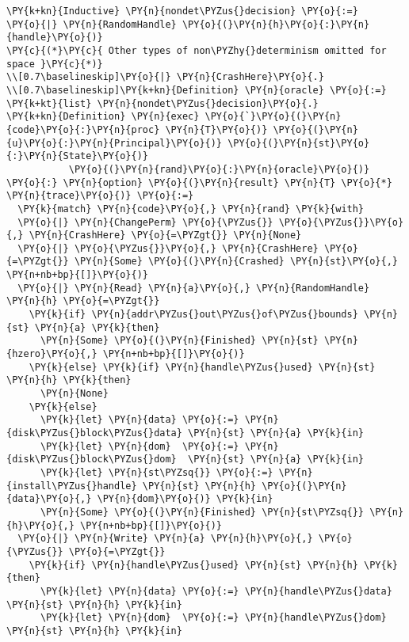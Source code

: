 \begin{BVerbatim}[commandchars=\\\{\},codes={\catcode`\$=3\catcode`\^=7\catcode`\_=8},fontsize=\footnotesize]
\PY{k+kn}{Inductive} \PY{n}{nondet\PYZus{}decision} \PY{o}{:=}
\PY{o}{|} \PY{n}{RandomHandle} \PY{o}{(}\PY{n}{h}\PY{o}{:}\PY{n}{handle}\PY{o}{)}
\PY{c}{(*}\PY{c}{ Other types of non\PYZhy{}determinism omitted for space }\PY{c}{*)}
\\[0.7\baselineskip]\PY{o}{|} \PY{n}{CrashHere}\PY{o}{.}
\\[0.7\baselineskip]\PY{k+kn}{Definition} \PY{n}{oracle} \PY{o}{:=} \PY{k+kt}{list} \PY{n}{nondet\PYZus{}decision}\PY{o}{.}
\PY{k+kn}{Definition} \PY{n}{exec} \PY{o}{`}\PY{o}{(}\PY{n}{code}\PY{o}{:}\PY{n}{proc} \PY{n}{T}\PY{o}{)} \PY{o}{(}\PY{n}{u}\PY{o}{:}\PY{n}{Principal}\PY{o}{)} \PY{o}{(}\PY{n}{st}\PY{o}{:}\PY{n}{State}\PY{o}{)}
           \PY{o}{(}\PY{n}{rand}\PY{o}{:}\PY{n}{oracle}\PY{o}{)} \PY{o}{:} \PY{n}{option} \PY{o}{(}\PY{n}{result} \PY{n}{T} \PY{o}{*} \PY{n}{trace}\PY{o}{)} \PY{o}{:=}
  \PY{k}{match} \PY{n}{code}\PY{o}{,} \PY{n}{rand} \PY{k}{with}
  \PY{o}{|} \PY{n}{ChangePerm} \PY{o}{\PYZus{}} \PY{o}{\PYZus{}}\PY{o}{,} \PY{n}{CrashHere} \PY{o}{=\PYZgt{}} \PY{n}{None}
  \PY{o}{|} \PY{o}{\PYZus{}}\PY{o}{,} \PY{n}{CrashHere} \PY{o}{=\PYZgt{}} \PY{n}{Some} \PY{o}{(}\PY{n}{Crashed} \PY{n}{st}\PY{o}{,} \PY{n+nb+bp}{[]}\PY{o}{)}
  \PY{o}{|} \PY{n}{Read} \PY{n}{a}\PY{o}{,} \PY{n}{RandomHandle} \PY{n}{h} \PY{o}{=\PYZgt{}}
    \PY{k}{if} \PY{n}{addr\PYZus{}out\PYZus{}of\PYZus{}bounds} \PY{n}{st} \PY{n}{a} \PY{k}{then}
      \PY{n}{Some} \PY{o}{(}\PY{n}{Finished} \PY{n}{st} \PY{n}{hzero}\PY{o}{,} \PY{n+nb+bp}{[]}\PY{o}{)}
    \PY{k}{else} \PY{k}{if} \PY{n}{handle\PYZus{}used} \PY{n}{st} \PY{n}{h} \PY{k}{then}
      \PY{n}{None}
    \PY{k}{else}
      \PY{k}{let} \PY{n}{data} \PY{o}{:=} \PY{n}{disk\PYZus{}block\PYZus{}data} \PY{n}{st} \PY{n}{a} \PY{k}{in}
      \PY{k}{let} \PY{n}{dom}  \PY{o}{:=} \PY{n}{disk\PYZus{}block\PYZus{}dom}  \PY{n}{st} \PY{n}{a} \PY{k}{in}
      \PY{k}{let} \PY{n}{st\PYZsq{}} \PY{o}{:=} \PY{n}{install\PYZus{}handle} \PY{n}{st} \PY{n}{h} \PY{o}{(}\PY{n}{data}\PY{o}{,} \PY{n}{dom}\PY{o}{)} \PY{k}{in}
      \PY{n}{Some} \PY{o}{(}\PY{n}{Finished} \PY{n}{st\PYZsq{}} \PY{n}{h}\PY{o}{,} \PY{n+nb+bp}{[]}\PY{o}{)}
  \PY{o}{|} \PY{n}{Write} \PY{n}{a} \PY{n}{h}\PY{o}{,} \PY{o}{\PYZus{}} \PY{o}{=\PYZgt{}}
    \PY{k}{if} \PY{n}{handle\PYZus{}used} \PY{n}{st} \PY{n}{h} \PY{k}{then}
      \PY{k}{let} \PY{n}{data} \PY{o}{:=} \PY{n}{handle\PYZus{}data} \PY{n}{st} \PY{n}{h} \PY{k}{in}
      \PY{k}{let} \PY{n}{dom}  \PY{o}{:=} \PY{n}{handle\PYZus{}dom}  \PY{n}{st} \PY{n}{h} \PY{k}{in}

\end{BVerbatim}

